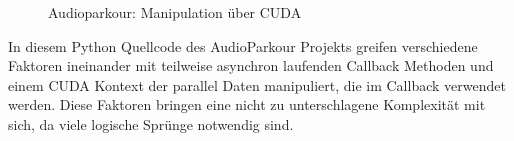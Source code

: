 \begin{figure}[h!]
	
	\caption{Audioparkour: Manipulation über CUDA}
	\label{fig:audioparkour_cuda+arrayShaping}
\end{figure}

In diesem Python Quellcode des AudioParkour Projekts greifen verschiedene Faktoren ineinander mit teilweise asynchron laufenden Callback Methoden und einem CUDA Kontext der parallel Daten manipuliert, die im Callback verwendet werden. Diese Faktoren bringen eine nicht zu unterschlagene Komplexität mit sich, da viele logische Sprünge notwendig sind.